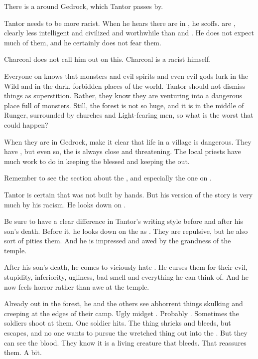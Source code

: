 \begin{changes}
    There is a  around Gedrock, which Tantor passes by. 
    
    Tantor needs to be more racist. 
    When he hears there are \meccara{} in \EreshKal, he scoffs. 
    \Meccara{} are , clearly less intelligent and civilized and worthwhile than \humans{} and \scathae. 
    He does not expect much of them, and he certainly does not fear them. 
    
    Charcoal does not call him out on this. 
    Charcoal is a racist himself.

    Everyone on \Azmith knows that monsters and evil spirits and even evil gods lurk in the Wild and in the dark, forbidden places of the world.
    \Jirad Tantor should not dismiss things as superstition.
    Rather, they know they are venturing into a dangerous place full of monsters.
    Still, the forest is not so huge, and it is in the middle of Runger, surrounded by churches and Light-fearing men, so what is the worst that could happen?
    
    When they are in Gedrock, make it clear that life in a village is dangerous. 
    They have \eidola, but even so, the \wylde is always close and threatening.
    The local priests have much work to do in keeping the \eidola blessed and keeping the \wylde out. 

    Remember to see the section about the , and especially the one on . 
    
    Tantor is certain that \EreshKal was not built by \meccaran hands. 
    But his version of the story is very much \coloured by his racism. 
    He looks down on \meccara. 
    
    Be sure to have a clear difference in Tantor's writing style before and after his son's death. 
    Before it, he looks down on the \meccara as . 
    They are repulsive, but he also sort of pities them. 
    And he is impressed and awed by the grandness of the temple. 
    
    After his son's death, he comes to viciously hate \meccara. 
    He curses them for their evil, stupidity, inferiority, ugliness, bad smell and everything he can think of. 
    And he now feels horror rather than awe at the temple. 
    
    Already out in the forest, he and the others see abhorrent things skulking and creeping at the edges of their camp. 
    Ugly midget \humanoids. 
    Probably \meccara. 
    Sometimes the soldiers shoot at them. 
    One soldier hits. 
    The thing shrieks and bleeds, but escapes, and no one wants to pursue the wretched thing out into the \wylde. 
    But they can see the blood. 
    They know it is a living creature that bleeds. 
    That reassures them. 
    A bit. 
    

\end{changes}
